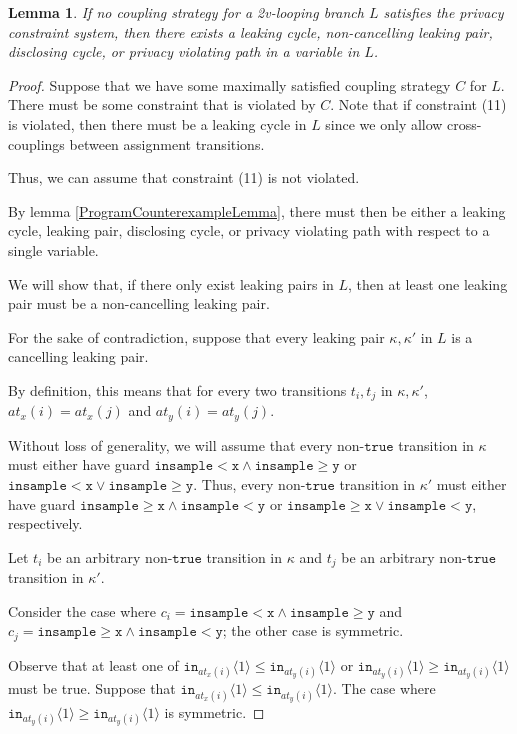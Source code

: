 \documentclass[12pt]{article}
\newcommand{\gguard}[1][x]{\texttt{insample}\geq #1}
\newcommand{\lguard}[1][x]{\texttt{insample} < #1}
\newcommand{\brangle}[1]{\langle #1 \rangle}
\newtheorem{lemma}[thm]{Lemma}
\theoremstyle{definition}
\begin{document}
\begin{lemma}
    If no coupling strategy for a 2v-looping branch $L$ satisfies the privacy constraint system, then there exists a leaking cycle, non-cancelling leaking pair, disclosing cycle, or privacy violating path in a variable in $L$.
\end{lemma}
\begin{proof}
    Suppose that we have some maximally satisfied coupling strategy $C$ for $L$. There must be some constraint that is violated by $C$. Note that if constraint (11) is violated, then there must be a leaking cycle in $L$ since we only allow cross-couplings between assignment transitions. 

    Thus, we can assume that constraint (11) is not violated. 

    By lemma \ref{ProgramCounterexampleLemma}, there must then be either a leaking cycle, leaking pair, disclosing cycle, or privacy violating path with respect to a single variable. 

    We will show that, if there only exist leaking pairs in $L$, then at least one leaking pair must be a non-cancelling leaking pair. 

    For the sake of contradiction, suppose that every leaking pair $\kappa, \kappa'$ in $L$ is a cancelling leaking pair. 

    By definition, this means that for every two transitions $t_i, t_j$ in $\kappa, \kappa'$, $at_x(i) = at_x(j)$ and $at_y(i) = at_y(j)$.

    Without loss of generality, we will assume that every non-$\texttt{true}$ transition in $\kappa$ must either have guard $\lguard[\texttt{x}]\land\gguard[\texttt{y}]$ or $\lguard[\texttt{x}]\lor\gguard[\texttt{y}]$. Thus, every non-$\texttt{true}$ transition in $\kappa'$ must either have guard $\gguard[\texttt{x}]\land\lguard[\texttt{y}]$ or $\gguard[\texttt{x}]\lor\lguard[\texttt{y}]$, respectively. 

    Let $t_i$ be an arbitrary non-$\texttt{true}$ transition in $\kappa$ and $t_j$ be an arbitrary non-$\texttt{true}$ transition in $\kappa'$.

    Consider the case where $c_i = \lguard[\texttt{x}]\land\gguard[\texttt{y}]$ and $c_j = \gguard[\texttt{x}]\land\lguard[\texttt{y}]$; the other case is symmetric.

    Observe that at least one of $\texttt{in}_{at_x(i)}\brangle{1}\leq \texttt{in}_{at_y(i)}\brangle{1}$ or $\texttt{in}_{at_y(i)}\brangle{1}\geq \texttt{in}_{at_y(i)}\brangle{1}$ must be true. Suppose that $\texttt{in}_{at_x(i)}\brangle{1}\leq \texttt{in}_{at_y(i)}\brangle{1}$. The case where $\texttt{in}_{at_y(i)}\brangle{1}\geq \texttt{in}_{at_y(i)}\brangle{1}$ is symmetric. 


\end{proof}
\end{document}
